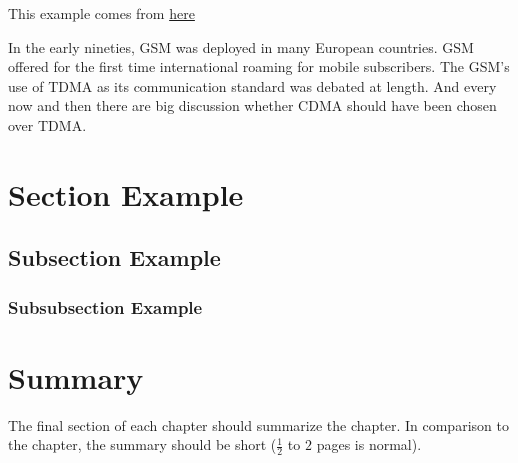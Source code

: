This example comes from \href{https://mirror.aarnet.edu.au/pub/CTAN/macros/latex/contrib/acronym/acronym.pdf}{here}

In the early nineties, \acs{GSM} was deployed in many European countries. \ac{GSM} offered for the first time international roaming for mobile subscribers. The \acs{GSM}’s use of \ac{TDMA} as its communication standard was debated at length. And every now and then there are big discussion whether \ac{CDMA} should have been chosen over \ac{TDMA}.


\section{Section Example}\label{sec:section_Example}
\subsection{Subsection Example}
\subsubsection{Subsubsection Example}

\section{Summary}
\label{s:Background-Summary}

The final section of each chapter should summarize the chapter. In comparison to the chapter, the summary should be short ($\frac{1}{2}$ to $2$ pages is normal).

